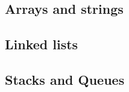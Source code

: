 \documentclass{report}
\begin{document}
    \pagebreak 
    \subsection{Arrays and strings}
    \begin{itemize}
        
    \end{itemize}

    \pagebreak 
    \subsection{Linked lists}
    \begin{itemize}
        
    \end{itemize}


    \pagebreak 
    \subsection{Stacks and Queues}
    \begin{itemize}
        
    \end{itemize}

    \pagebreak 
\end{document}
